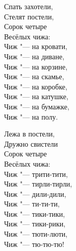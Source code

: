 \begin{center}
\begin{minipage}{0.45\textwidth}
Спать захотели, \\
Стелят постели, \\
Сорок четыре \\
Весёлых чижа: \\
Чиж "--- на кровати, \\
Чиж "--- на диване, \\
Чиж "--- на корзине, \\
Чиж "--- на скамье, \\
Чиж "--- на коробке, \\
Чиж "--- на катушке, \\
Чиж "--- на бумажке, \\
Чиж "--- на полу. 
\end{minipage}
\end{center}

\begin{center}
\begin{minipage}{0.5\textwidth}
Лежа в постели, \\
Дружно свистели \\
Сорок четыре \\
Весёлых чижа: \\
Чиж "--- трити-тити, \\
Чиж "--- тирли-тирли, \\
Чиж "--- дили-дили, \\
Чиж "--- ти-ти-ти, \\
Чиж "--- тики-тики, \\
Чиж "--- тики-рики, \\
Чиж "--- тюти-люти, \\
Чиж "--- тю-тю-тю! 
\end{minipage}
\end{center}

